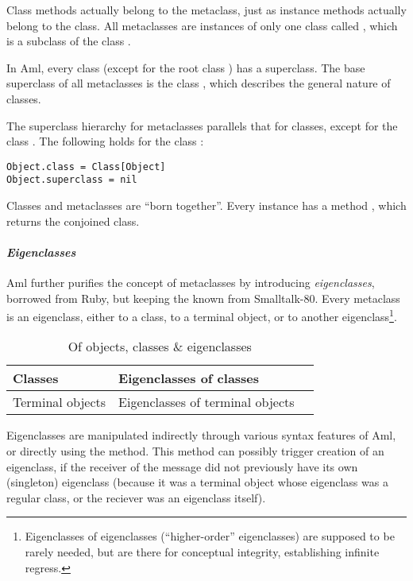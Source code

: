 Class methods actually belong to the metaclass, just as instance methods actually belong to the class. All metaclasses are instances of only one class called , which is a subclass of the class . 

In Aml, every class (except for the root class ) has a superclass. The base superclass of all metaclasses is the class , which describes the general nature of classes. 

The superclass hierarchy for metaclasses parallels that for classes, except for the class . The following holds for the class :
\begin{lstlisting}[deletekeywords={class}]
Object.class = Class[Object]
Object.superclass = nil
\end{lstlisting}

Classes and metaclasses are ``born together''. Every  instance has a method , which returns the conjoined class. 

\paragraph{\em Eigenclasses}
Aml further purifies the concept of metaclasses by introducing {\em eigenclasses}, borrowed from Ruby, but keeping the  known from Smalltalk-80. Every metaclass is an eigenclass, either to a class, to a terminal object, or to another eigenclass\footnote{Eigenclasses of eigenclasses (``higher-order'' eigenclasses) are supposed to be rarely needed, but are there for conceptual integrity, establishing infinite regress.}. 

\begin{table}[ht]
  \centering
  \caption{Of objects, classes \& eigenclasses}
  \renewcommand{\arraystretch}{1.7}
  \begin{tabular}{ | >{\centering}m{3.5cm} | >{\centering}m{3.5cm} | >{\centering\arraybackslash}m{6cm} | }
  	\hline
    Classes & Eigenclasses of classes & \multirow{2}{*}{Eigenclasses of eigenclasses} \\ \cline{1-2}
    Terminal objects & Eigenclasses of terminal objects & \\
    \hline
  \end{tabular}
\end{table}

Eigenclasses are manipulated indirectly through various syntax features of Aml, or directly using the  method. This method can possibly trigger creation of an eigenclass, if the receiver of the  message did not previously have its own (singleton) eigenclass (because it was a terminal object whose eigenclass was a regular class, or the reciever was an eigenclass itself). 

